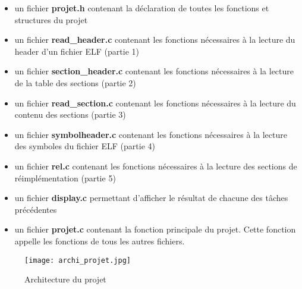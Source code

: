 \documentclass[12pt, a4paper]{article}
\begin{document}
\begin{itemize}

\item un fichier \textbf{projet.h} contenant la déclaration de toutes les fonctions et structures du projet

\item un fichier \textbf{read\_header.c} contenant les fonctions nécessaires à la lecture du header d'un fichier ELF (partie 1)

\item un fichier \textbf{section\_header.c} contenant les fonctions nécessaires à la lecture de la table des sections (partie 2)

\item un fichier \textbf{read\_section.c} contenant les fonctions nécessaires à la lecture du contenu des sections (partie 3)

\item un fichier \textbf{symbolheader.c} contenant les fonctions nécessaires à la lecture des symboles du fichier ELF (partie 4)

\item un fichier \textbf{rel.c} contenant les fonctions nécessaires à la lecture des sections de réimplémentation (partie 5)

\item un fichier \textbf{display.c} permettant d'afficher le résultat de chacune des tâches précédentes

\item un fichier \textbf{projet.c} contenant la fonction principale du projet. Cette fonction appelle les fonctions de tous les autres fichiers.
\end{itemize}

\begin{figure}[!h]
    \begin{center}
        \texttt{[image: archi\_projet.jpg]}
        \caption{Architecture du projet}
    \end{center}
\end{figure}
\end{document}
